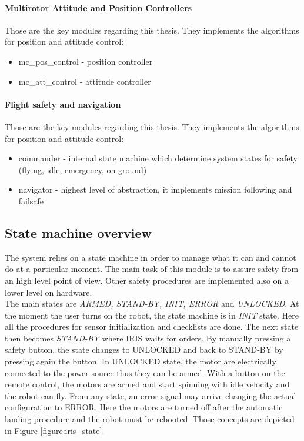 \paragraph{Multirotor Attitude and Position Controllers} Those are the key modules regarding this thesis. They implements the algorithms for position and attitude control:
\begin{itemize}
	\item mc\_pos\_control - position controller
	\item mc\_att\_control - attitude controller
\end{itemize}

\paragraph{Flight safety and navigation} Those are the key modules regarding this thesis. They implements the algorithms for position and attitude control:
\begin{itemize}
	\item commander - internal state machine which determine system states for safety (flying, idle, emergency, on ground)
	\item navigator - highest level of abstraction, it implements mission following and failsafe
\end{itemize}

\subsection{State machine overview}

The system relies on a state machine in order to manage what it can and cannot do at a particular moment. The main task of this module is to assure safety from an high level point of view. Other safety procedures are implemented also on a lower level on hardware. \\

\noindent
The main states are \textit{ARMED, STAND-BY, INIT, ERROR} and \textit{UNLOCKED}. At the moment the user turns on the robot, the state machine is in \textit{INIT} state. Here all the procedures for sensor initialization and checklists are done. The next state then becomes \textit{STAND-BY} where IRIS waits for orders. By manually pressing a safety button, the state changes to UNLOCKED and back to STAND-BY by pressing again the button. In UNLOCKED state, the motor are electrically connected to the power source thus they can be armed. With a button on the remote control, the motors are armed and start spinning with idle velocity and the robot can fly. From any state, an error signal may arrive changing the actual configuration to ERROR. Here the motors are turned off after the automatic landing procedure and the robot must be rebooted. Those concepts are depicted in Figure \ref{figure:iris_state}.

